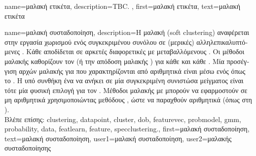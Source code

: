 {name={\foreignlanguage{greek}{μαλακή ετικέτα}},
	description={TBC. },
 	first={\foreignlanguage{greek}{μαλακή ετικέτα}},
 	text={\foreignlanguage{greek}{μαλακή ετικέτα}}
}

{name={\foreignlanguage{greek}{μαλακή συσταδοποίηση}}, 
	description={\foreignlanguage{greek}{Η μαλακή}  
		(soft clustering) \foreignlanguage{greek}{αναφέρεται στην εργασία χωρισμού ενός συγκεκριμένου συνόλου} 
		 \foreignlanguage{greek}{σε (μερικές) αλληλεπικαλυπτόμενες} . 
		\foreignlanguage{greek}{Κάθε}  \foreignlanguage{greek}{αποδίδεται σε αρκετές διαφορετικές} 
		 \foreignlanguage{greek}{με μεταβαλλόμενους} . \foreignlanguage{greek}{Οι 
		μέθοδοι μαλακής}  \foreignlanguage{greek}{καθορίζουν τον}
		 (\foreignlanguage{greek}{ή την απόδοση μαλακής} ) \foreignlanguage{greek}{για 
		κάθε}  \foreignlanguage{greek}{και κάθε} .
		\foreignlanguage{greek}{Μία προσέγγιση αρχών μαλακής}  \foreignlanguage{greek}{για} 
		 \foreignlanguage{greek}{που χαρακτηρίζονται από αριθμητικά}  
		\foreignlanguage{greek}{είναι μέσω ενός}  \foreignlanguage{greek}{όπως το} . 
		\foreignlanguage{greek}{Η}  \foreignlanguage{greek}{υπό συνθήκη ένα}  
		\foreignlanguage{greek}{να ανήκει σε μία συγκεκριμένη συνιστώσα μεί\-γματος είναι τότε μία φυσική επιλογή για τον} 
		. \foreignlanguage{greek}{Μέθοδοι μαλακής}   \foreignlanguage{greek}{με} 
		 \foreignlanguage{greek}{μπορούν να εφαρμοστούν σε μη αριθμητικά}  
		\foreignlanguage{greek}{χρησιμοποιώντας μεθόδους} , \foreignlanguage{greek}{ώστε να παραχθούν 
		αριθμητικά}  (\foreignlanguage{greek}{όπως στη} ).
		\\
		\foreignlanguage{greek}{Βλέπε επίσης:} \gls{clustering}, \gls{datapoint}, \gls{cluster}, \gls{dob}, \gls{featurevec}, \gls{probmodel}, 
		\gls{gmm}, \gls{probability}, \gls{data}, \gls{featlearn}, \gls{feature}, \gls{specclustering}.},
	first={\foreignlanguage{greek}{μαλακή συσταδοποίηση}},
	text={\foreignlanguage{greek}{μαλακή συσταδοποίηση}},
	user1={\foreignlanguage{greek}{μαλακή συσταδοποίηση}}, %
	user2={\foreignlanguage{greek}{μαλακής συσταδοποίησης}} %
}

